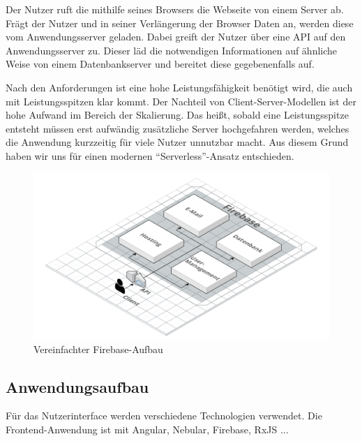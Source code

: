 Der Nutzer ruft die mithilfe seines Browsers die Webseite von einem Server ab.
Frägt der Nutzer und in seiner Verlängerung der Browser Daten an, werden diese vom Anwendungsserver geladen.
Dabei greift der Nutzer über eine \ac{API} auf den Anwendungsserver zu.
Dieser läd die notwendigen Informationen auf ähnliche Weise von einem Datenbankserver und bereitet diese gegebenenfalls auf.

Nach den Anforderungen ist eine hohe Leistungsfähigkeit benötigt wird, die auch mit Leistungsspitzen klar kommt.
Der Nachteil von Client-Server-Modellen ist der hohe Aufwand im Bereich der Skalierung.
Das heißt, sobald eine Leistungsspitze entsteht müssen erst aufwändig zusätzliche Server hochgefahren werden, welches die Anwendung kurzzeitig für viele Nutzer unnutzbar macht.
Aus diesem Grund haben wir uns für einen modernen \enquote{Serverless}-Ansatz entschieden.





\begin{figure}[h]
    \centering
    \includegraphics[width=.9\textwidth]{img/Firebase.png}
    \caption{Vereinfachter Firebase-Aufbau}
    \label{fig:firebaseAufbau}
\end{figure}



\subsection{Anwendungsaufbau}
Für das Nutzerinterface werden verschiedene Technologien verwendet.
Die Frontend-Anwendung ist mit Angular, Nebular, Firebase, RxJS ... %


